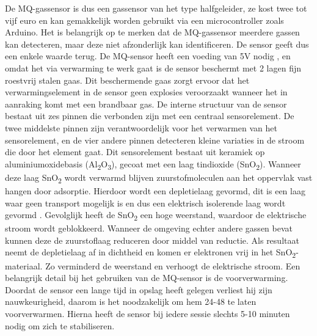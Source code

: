 De MQ-gassensor is dus een gassensor van het type halfgeleider, ze kost twee tot vijf euro en kan gemakkelijk worden gebruikt via een microcontroller zoals Arduino. Het is belangrijk op te merken dat de MQ-gassensor meerdere gassen kan detecteren, maar deze niet afzonderlijk kan identificeren. De sensor geeft dus een enkele waarde terug.
De MQ-sensor heeft een voeding van 5V nodig
, en omdat het via verwarming te werk gaat is de sensor beschermt met 2 lagen fijn roestvrij stalen gaas. Dit beschermende gaas zorgt ervoor dat het verwarmingselement in de sensor geen explosies veroorzaakt wanneer het in aanraking komt met een brandbaar gas.
De interne structuur van de sensor bestaat uit zes pinnen die verbonden zijn met een centraal sensorelement. De twee middelste pinnen zijn verantwoordelijk voor het verwarmen van het sensorelement, en de vier andere pinnen detecteren kleine variaties in de stroom die door het element gaat. Dit sensorelement bestaat uit keramiek op aluminiumoxidebasis (Al\textsubscript{2}O\textsubscript{3}), gecoat met een laag tindioxide (SnO\textsubscript{2}).
Wanneer deze laag SnO\textsubscript{2} wordt verwarmd blijven zuurstofmoleculen aan het oppervlak vast hangen door adsorptie. Hierdoor wordt een depletielaag gevormd, dit is een laag waar geen transport mogelijk is en dus een elektrisch isolerende laag wordt gevormd
. Gevolglijk heeft de SnO\textsubscript{2} een hoge weerstand, waardoor de elektrische stroom wordt geblokkeerd. Wanneer de omgeving echter andere gassen bevat kunnen deze de zuurstoflaag reduceren door middel van reductie. Als resultaat neemt de depletielaag af in dichtheid en komen er elektronen vrij in het SnO\textsubscript{2}-materiaal. Zo verminderd de weerstand en verhoogt de elektrische stroom.
Een belangrijk detail bij het gebruiken van de MQ-sensor is de voorverwarming. Doordat de sensor een lange tijd in opslag heeft gelegen verliest hij zijn nauwkeurigheid, daarom is het noodzakelijk om hem 24-48 te laten voorverwarmen. Hierna heeft de sensor bij iedere sessie slechts 5-10 minuten nodig om zich te stabiliseren.

